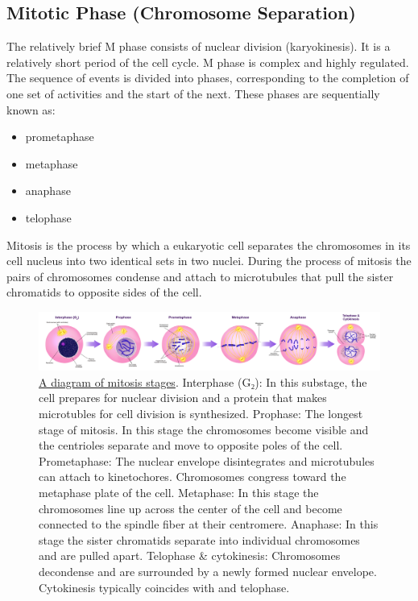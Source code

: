 \hypertarget{mitotic-phase-chromosome-separation}{%
\subsection{Mitotic Phase (Chromosome Separation)}\label{mitotic-phase-chromosome-separation}}

The relatively brief M phase consists of nuclear division (karyokinesis). It is a relatively short period of the cell cycle. M phase is complex and highly regulated. The sequence of events is divided into phases, corresponding to the completion of one set of activities and the start of the next. These phases are sequentially known as:

\begin{itemize}
\tightlist
\item
  prometaphase
\item
  metaphase
\item
  anaphase
\item
  telophase
\end{itemize}

Mitosis is the process by which a eukaryotic cell separates the chromosomes in its cell nucleus into two identical sets in two nuclei. During the process of mitosis the pairs of chromosomes condense and attach to microtubules that pull the sister chromatids to opposite sides of the cell.



\begin{figure}

{\centering \includegraphics[width=0.7\linewidth]{./figures/cellcycle/Mitosis_Stages} 

}

\caption{\href{https://commons.wikimedia.org/wiki/File:Mitosis_Stages.svg}{A diagram of mitosis stages}. Interphase (G₂): In this substage, the cell prepares for nuclear division and a protein that makes microtubles for cell division is synthesized. Prophase: The longest stage of mitosis. In this stage the chromosomes become visible and the centrioles separate and move to opposite poles of the cell. Prometaphase: The nuclear envelope disintegrates and microtubules can attach to kinetochores. Chromosomes congress toward the metaphase plate of the cell. Metaphase: In this stage the chromosomes line up across the center of the cell and become connected to the spindle fiber at their centromere. Anaphase: In this stage the sister chromatids separate into individual chromosomes and are pulled apart. Telophase \& cytokinesis: Chromosomes decondense and are surrounded by a newly formed nuclear envelope. Cytokinesis typically coincides with and telophase.}\label{fig:mito}
\end{figure}

